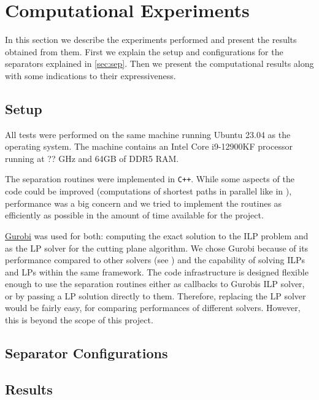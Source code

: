 \section{Computational Experiments}\label{sec:comp}
In this section we describe the experiments performed and present the results obtained from them.
First we explain the setup and configurations for the separators explained in \cref{sec:sep}.
Then we present the computational results along with some indications to their expressiveness.

\subsection{Setup}\label{subsec:comp_setup}
All tests were performed on the same machine running Ubuntu 23.04 as the operating system.
The machine contains an Intel Core i9-12900KF processor running at ?? GHz and 64GB of DDR5 RAM. 

The separation routines were implemented in \texttt{C++}.
While some aspects of the code could be improved (\eg computations of shortest paths in parallel like in \cite{sorensenSeparationHeuristic2Partition2020}),
performance was a big concern and we tried to implement the routines as efficiently as possible in the amount of time available for the project.

\href{https://www.gurobi.com}{Gurobi} was used for both: computing the exact solution to the ILP problem and as the LP solver for the cutting plane algorithm.
We chose Gurobi because of its performance compared to other solvers (see \cite{meindlAnalysisCommercialFree2012}) and the capability of solving ILPs and LPs within the same framework.
The code infrastructure is designed flexible enough to use the separation routines either as callbacks to Gurobis ILP solver, or by passing a LP solution directly to them.
Therefore, replacing the LP solver would be fairly easy, \eg for comparing performances of different solvers.
However, this is beyond the scope of this project.

\subsection{Separator Configurations}\label{subsec:run_configs}

\subsection{Results}\label{subsec:comp_results}
